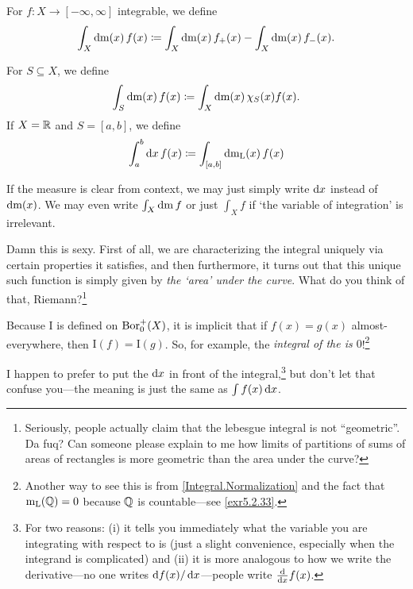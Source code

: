 \begin{thm}[Integral]
\begin{savenotes}
\begin{rmk}
For $f:X\rightarrow [-\infty ,\infty ]$ integrable, we define
\begin{equation}
\int _X\mathop{}\!\mathrm{d} \mathrm{m} (x)\, f(x)\coloneqq \int _X\mathop{}\!\mathrm{d} \mathrm{m} (x)\, f_+(x)-\int _X\mathop{}\!\mathrm{d} \mathrm{m} (x)\, f_-(x).
\end{equation}
\end{rmk}
\begin{rmk}
For $S\subseteq X$, we define
\begin{equation}
\int _S\mathop{}\!\mathrm{d} \mathrm{m} (x)\, f(x)\coloneqq \int _X\mathop{}\!\mathrm{d} \mathrm{m} (x)\, \chi _S(x)f(x).
\end{equation}
If $X=\mathbb{R}$ and $S=[a,b]$, we define
\begin{equation}
\int _a^b\mathop{}\!\mathrm{d} x\, f(x)\coloneqq \int _{[a,b]}\mathop{}\!\mathrm{d} \mathrm{m} _{\mathrm{L}}(x)\, f(x)
\end{equation}
\end{rmk}
\begin{rmk}
If the measure is clear from context, we may just simply write $\mathop{}\!\mathrm{d} x$ instead of $\mathop{}\!\mathrm{d} \mathrm{m} (x)$.  We may even write $\int _X\mathop{}\!\mathrm{d} \mathrm{m} \, f$ or just $\int _Xf$ if `the variable of integration' is irrelevant.
\end{rmk}
\begin{rmk}
Damn this is sexy.  First of all, we are characterizing the integral uniquely via certain properties it satisfies, and then furthermore, it turns out that this unique such function is simply given by \emph{the `area' under the curve}.  What do you think of that, Riemann?\footnote{Seriously, people actually claim that the lebesgue integral is not ``geometric''.  Da fuq?  Can someone please explain to me how limits of partitions of sums of areas of rectangles is more geometric than the area under the curve?}
\end{rmk}
\begin{rmk}
Because $\mathrm{I}$ is defined on $\operatorname{Bor} _0^+(X)$, it is implicit that if $f(x)=g(x)$ almost-everywhere, then $\mathrm{I}(f)=\mathrm{I}(g)$.  So, for example, the \emph{integral of the  is $0$}!\footnote{Another way to see this is from \ref{Integral.Normalization} and the fact that $\mathrm{m} _{\mathrm{L}}(\mathbb{Q} )=0$ because $\mathbb{Q}$ is countable---see \cref{exr5.2.33}.}
\end{rmk}
\begin{rmk}
I happen to prefer to put the $\mathop{}\!\mathrm{d} x$ in front of the integral,\footnote{For two reasons:  (i) it tells you immediately what the variable you are integrating with respect to is (just a slight convenience, especially when the integrand is complicated) and (ii) it is more analogous to how we write the derivative---no one writes $\mathop{}\!\mathrm{d} f(x)/\mathop{}\!\mathrm{d} x$---people write $\frac{\mathop{}\!\mathrm{d}}{\mathop{}\!\mathrm{d} x}f(x)$.} but don't let that confuse you---the meaning is just the same as $\int f(x)\mathop{}\!\mathrm{d} x$.

\end{rmk}
\end{savenotes}
\end{thm}
